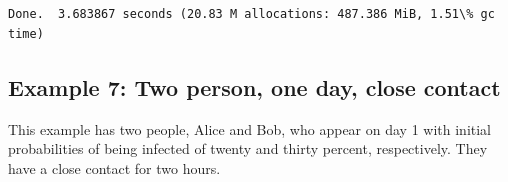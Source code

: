 \documentclass[11pt]{article}
\begin{document}
    \begin{center}
    \end{center}
    { \hspace*{\fill} \\}
    
    \begin{Verbatim}[commandchars=\\\{\}]

Done.  3.683867 seconds (20.83 M allocations: 487.386 MiB, 1.51\% gc time)
    \end{Verbatim}
\newpage
    \hypertarget{example-7-two-person-one-day-close-contact}{%
\subsection{Example 7: Two person, one day, close
contact}\label{example-7-two-person-one-day-close-contact}}

This example has two people, Alice and Bob, who appear on day 1 with
initial probabilities of being infected of twenty and thirty percent,
respectively. They have a close contact for two hours.
\end{document}
